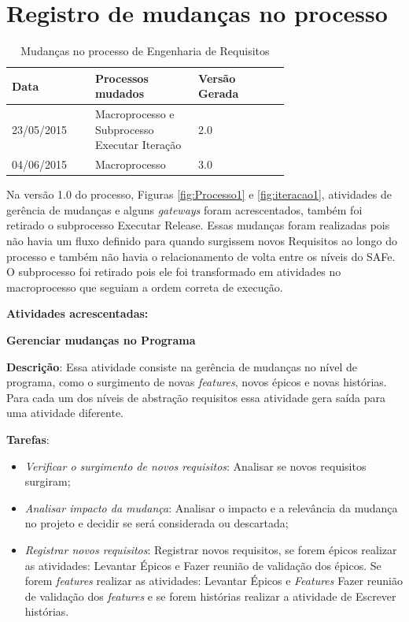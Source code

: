 \chapter{Registro de mudanças no processo}


\begin{table}[!h]
\centering
\caption{Mudanças no processo de Engenharia de Requisitos}
\label{Rotulo}
  \begin{tabular}{p{0.20\linewidth}p{0.25\linewidth}p{0.25\linewidth}}
  \hline
  Data  & Processos mudados & Versão Gerada\\
  \hline

  23/05/2015 & Macroprocesso e Subprocesso Executar Iteração & 2.0\\

  04/06/2015  & Macroprocesso & 3.0 \\

  \hline
  \end{tabular}
\end{table}

Na versão 1.0 do processo, Figuras \ref{fig:Processo1} e \ref{fig:iteracao1}, atividades de gerência de mudanças e alguns \textit{gateways} foram acrescentados, também foi retirado o subprocesso
  Executar Release. Essas mudanças foram realizadas pois não havia um fluxo definido para quando
  surgissem novos Requisitos ao longo do processo e também não havia o relacionamento de volta entre os níveis do SAFe. O subprocesso foi retirado
  pois ele foi transformado em atividades no macroprocesso que seguiam a ordem correta de execução.

\textbf{Atividades acrescentadas:}

\textbf{Gerenciar mudanças no Programa}

  \textbf{Descrição}: Essa atividade consiste na gerência de mudanças no nível de programa, como o surgimento de novas 
  \textit{features}, novos épicos e novas histórias. Para cada um dos níveis de abstração requisitos essa atividade gera saída
  para uma atividade diferente.

  \textbf{Tarefas}:
  \begin{itemize}
   \item \indent \textit{Verificar o surgimento de novos requisitos}: Analisar se novos requisitos surgiram;

   \item \indent \textit{Analisar impacto da mudança}: Analisar o impacto e a relevância da mudança no projeto e decidir se será considerada
   ou descartada;

   \item \indent \textit{Registrar novos requisitos}: Registrar novos requisitos, se forem épicos realizar as atividades: Levantar Épicos e 
   Fazer reunião de validação dos épicos. Se forem \textit{features} realizar as atividades: Levantar Épicos e \textit{Features}  
   Fazer reunião de validação dos \textit{features} e se forem histórias realizar a atividade de Escrever histórias.
  
  \end{itemize}

